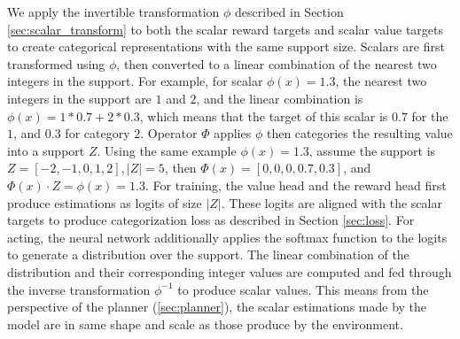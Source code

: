 We apply the invertible transformation \( \phi \) described in Section \ref{sec:scalar_transform} to both the scalar reward targets and scalar value targets to create categorical representations with the same support size.
Scalars are first transformed using \( \phi \), then converted to a linear combination of the nearest two integers in the support.
For example, for scalar \(\phi(x) = 1.3\), the nearest two integers in the support are $1$ and $2$, and the linear combination is \( \phi(x) = 1 * 0.7 + 2 * 0.3 \), which means that the target of this scalar is $0.7$ for the $1$, and $0.3$ for category $2$.
Operator $\Phi$ applies $\phi$ then categories the resulting value into a support $Z$.
Using the same example $\phi(x) = 1.3$, assume the support is $Z = [-2, -1, 0, 1, 2], |Z| = 5$,
then $\Phi(x) = [0, 0, 0, 0.7, 0.3]$, and $\Phi(x) \cdot Z = \phi(x) = 1.3$.
For training, the value head and the reward head first produce estimations as logits of size $|Z|$.
These logits are aligned with the scalar targets to produce categorization loss as described in Section \ref{sec:loss}.
For acting, the neural network additionally applies the softmax function to the logits to generate a distribution over the support.
The linear combination of the distribution and their corresponding integer values are computed and fed through the inverse transformation \( \phi^{-1}\) to produce scalar values.
This means from the perspective of the planner (\ref{sec:planner}), the scalar estimations made by the model are in same shape and scale as those produce by the environment.

